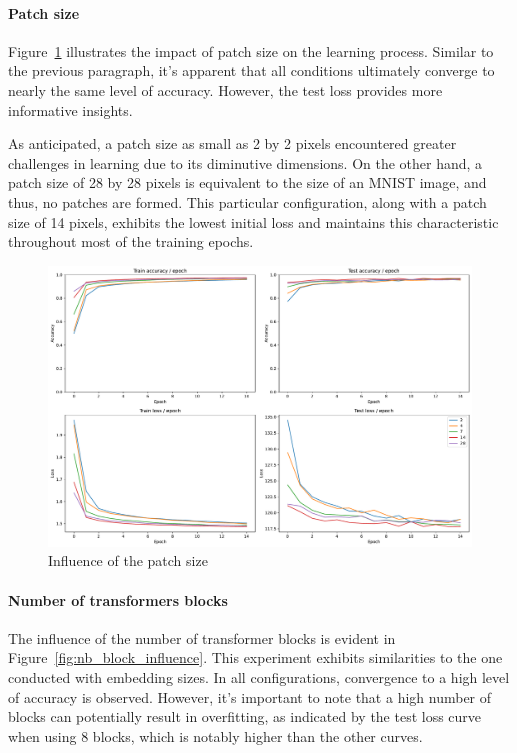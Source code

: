 \paragraph{Patch size}
Figure~\ref{fig:patch_size_influence} illustrates the impact of patch size on the learning process. Similar to the previous paragraph, it's apparent that all conditions ultimately converge to nearly the same level of accuracy. However, the test loss provides more informative insights.

As anticipated, a patch size as small as 2 by 2 pixels encountered greater challenges in learning due to its diminutive dimensions. On the other hand, a patch size of 28 by 28 pixels is equivalent to the size of an MNIST image, and thus, no patches are formed. This particular configuration, along with a patch size of 14 pixels, exhibits the lowest initial loss and maintains this characteristic throughout most of the training epochs.

\begin{figure}[H]
    \centering
    \includegraphics*[width=\textwidth]{figs/Transformers/patch_size_influence.pdf}
    \caption{Influence of the patch size}
    \label{fig:patch_size_influence}
\end{figure}

\paragraph{Number of transformers blocks}
The influence of the number of transformer blocks is evident in Figure~\ref{fig:nb_block_influence}. This experiment exhibits similarities to the one conducted with embedding sizes. In all configurations, convergence to a high level of accuracy is observed. However, it's important to note that a high number of blocks can potentially result in overfitting, as indicated by the test loss curve when using 8 blocks, which is notably higher than the other curves.

